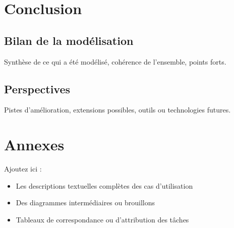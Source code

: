 \documentclass{article}
\begin{document}
\section{Conclusion}
\subsection{Bilan de la modélisation}
Synthèse de ce qui a été modélisé, cohérence de l’ensemble, points forts.

\subsection{Perspectives}
Pistes d'amélioration, extensions possibles, outils ou technologies futures.

\appendix
\section{Annexes}
Ajoutez ici :
\begin{itemize}
    \item Les descriptions textuelles complètes des cas d’utilisation
    \item Des diagrammes intermédiaires ou brouillons
    \item Tableaux de correspondance ou d’attribution des tâches
\end{itemize}
\end{document}
